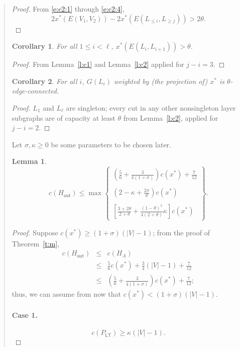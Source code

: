 \documentclass[11pt,letterpaper]{article}
\newtheorem{lemma}{Lemma}
\newtheorem{cor}{Corollary}
\begin{document}
\begin{quote}
\begin{proof}
From \eqref{e:c2:1} through \eqref{e:c2:4},\[
2x^*(E(V_1,V_2))-2x^*(E(L_{\leq i},L_{\geq j}))>2\theta
.\]
\end{proof}

\begin{cor}\label{c:ccut}
For all $1\leq i<\ell$, $x^*(E(L_i,L_{i+1}))>\theta$.
\end{cor}
\begin{proof}
From Lemma~\ref{l:c1} and Lemma~\ref{l:c2} applied for $j-i=3$.
\end{proof}

\begin{cor}\label{c:clayer}
For all $i$, $G(L_i)$ weighted by (the projection of) $x^*$ is $\theta$-edge-connected.
\end{cor}
\begin{proof}
$L_1$ and $L_\ell$ are singleton; every cut in any other nonsingleton layer subgraphs are of capacity at least $\theta$ from Lemma~\ref{l:c2}, applied for $j-i=2$.
\end{proof}

Let $\sigma,\kappa\geq 0$ be some parameters to be chosen later.

\begin{lemma}\label{l:unitgmain}
\[
c(H_{\mathsf{out}})\leq \max\left\{
\begin{array}{l}
\displaystyle \left( \frac{5}{6}+\frac{3}{4(1+\sigma)} \right) c(x^*)+\frac{7}{12}\\
\\
\displaystyle \left( 2-\kappa+\frac{2\sigma}{\theta} \right) c(x^*)\\
\\
\displaystyle \left[ \frac{3+2\theta}{2+\theta} + \frac{(1-\theta)^2}{4(2+\theta)} \kappa \right] c(x^*)
\end{array}\right\}
.\]
\end{lemma}
\begin{proof}
Suppose $c(x^*)\geq (1+\sigma)(|V|-1)$; from the proof of Theorem~\ref{t:m},\begin{eqnarray*}
c(H_{\mathsf{out}}) &\leq& c(H_A)\\
&\leq& \frac{5}{6}c(x^*)+\frac{3}{4}(|V|-1)+\frac{7}{12}\\
&\leq& \left(\frac{5}{6}+\frac{3}{4(1+\sigma)}\right)c(x^*)+\frac{7}{12}
;\end{eqnarray*}thus, we can assume from now that $c(x^*)<(1+\sigma)(|V|-1)$.

\paragraph{Case 1.}\begin{equation}\label{e:case1}
c(P_{\mathsf{LT}})\geq \kappa (|V|-1)
.\end{equation}


\end{proof}
\end{quote}
\end{document}
